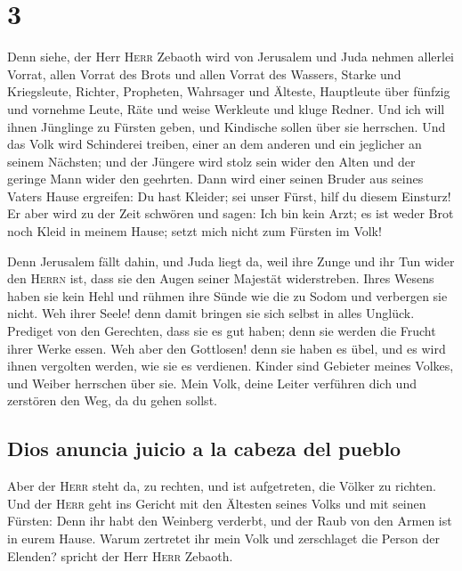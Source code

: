 \hypertarget{section-2}{%
\section{3}\label{section-2}}

 Denn siehe, der Herr \textsc{Herr} Zebaoth wird von
Jerusalem und Juda nehmen allerlei Vorrat, allen Vorrat des Brots und
allen Vorrat des Wassers,  Starke und Kriegsleute,
Richter, Propheten, Wahrsager und Älteste,  Hauptleute
über fünfzig und vornehme Leute, Räte und weise Werkleute und kluge
Redner.  Und ich will ihnen Jünglinge zu Fürsten geben,
und Kindische sollen über sie herrschen.  Und das Volk
wird Schinderei treiben, einer an dem anderen und ein jeglicher an
seinem Nächsten; und der Jüngere wird stolz sein wider den Alten und der
geringe Mann wider den geehrten.  Dann wird einer seinen
Bruder aus seines Vaters Hause ergreifen: Du hast Kleider; sei unser
Fürst, hilf du diesem Einsturz!  Er aber wird zu der Zeit
schwören und sagen: Ich bin kein Arzt; es ist weder Brot noch Kleid in
meinem Hause; setzt mich nicht zum Fürsten im Volk!

 Denn Jerusalem fällt dahin, und Juda liegt da, weil ihre
Zunge und ihr Tun wider den \textsc{Herrn} ist, dass sie den Augen
seiner Majestät widerstreben.  Ihres Wesens haben sie kein
Hehl und rühmen ihre Sünde wie die zu Sodom und verbergen sie nicht. Weh
ihrer Seele! denn damit bringen sie sich selbst in alles Unglück.
 Prediget von den Gerechten, dass sie es gut haben; denn
sie werden die Frucht ihrer Werke essen.  Weh aber den
Gottlosen! denn sie haben es übel, und es wird ihnen vergolten werden,
wie sie es verdienen.  Kinder sind Gebieter meines
Volkes, und Weiber herrschen über sie. Mein Volk, deine Leiter verführen
dich und zerstören den Weg, da du gehen sollst.

\hypertarget{dios-anuncia-juicio-a-la-cabeza-del-pueblo}{%
\subsection{Dios anuncia juicio a la cabeza del
pueblo}\label{dios-anuncia-juicio-a-la-cabeza-del-pueblo}}

 Aber der \textsc{Herr} steht da, zu rechten, und ist
aufgetreten, die Völker zu richten.  Und der
\textsc{Herr} geht ins Gericht mit den Ältesten seines Volks und mit
seinen Fürsten: Denn ihr habt den Weinberg verderbt, und der Raub von
den Armen ist in eurem Hause.  Warum zertretet ihr mein
Volk und zerschlaget die Person der Elenden? spricht der Herr
\textsc{Herr} Zebaoth.

